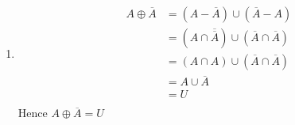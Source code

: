 \documentclass[12pt letter]{report}
\begin{document}
{\begin{enumerate}
\begin{align*}
                       & = \overline{A} \tag*{By Second Identity Law}                                                           \\
          \end{align*}
          Hence $A \oplus U = \overline{A}$
    \item
          \begin{align*}
            A \oplus \overline{A} & = \left( A - \overline{A} \right) \cup \left( \overline{A} - A \right)
            \tag*{Definition of Symmetric Difference}                                                                                     \\
                                  & = \left( A \cap \overline{\overline{A}} \right) \cup \left( \overline{A} \cap \overline{A} \right)
            \tag*{Definition of Difference}                                                                                               \\
                                  & = \left( A \cap A \right) \cup \left( \overline{A} \cap \overline{A} \right) \tag*{By Complementation
            Law}                                                                                                                          \\
                                  & = A \cup \overline{A} \tag*{By Second Idempotent Law}                                                 \\
                                  & = U \tag*{By First Complement Law}                                                                    \\
          \end{align*}
          Hence $A \oplus \overline{A} = U$
  \end{enumerate}
}



\end{document}
